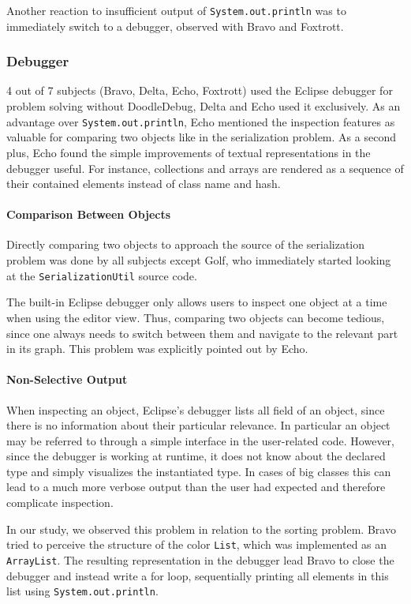 \documentclass[english]{scrartcl}
\newcommand{\DD}{Dood\-le\-De\-bug\xspace}
\newcommand{\println}{\texttt{Sys\-tem.\-out.\-println}\xspace}
\begin{document}
Another reaction to insufficient output of \println was to immediately switch to a debugger, observed with Bravo and Foxtrott.

\subsubsection{Debugger}
4 out of 7 subjects (Bravo, Delta, Echo, Foxtrott) used the Eclipse debugger for problem solving without \DD, Delta and Echo used it exclusively.
As an advantage over \println, Echo mentioned the inspection features as valuable for comparing two objects like in the serialization problem.
As a second plus, Echo found the simple improvements of textual representations in the debugger useful.
For instance, collections and arrays are rendered as a sequence of their contained elements instead of class name and hash.

\paragraph{Comparison Between Objects}
Directly comparing two objects to approach the source of the serialization problem was done by all subjects except Golf, who immediately started looking at the \texttt{SerializationUtil} source code.

The built-in Eclipse debugger only allows users to inspect one object at a time when using the editor view.
Thus, comparing two objects can become tedious, since one always needs to switch between them and navigate to the relevant part in its graph.
This problem was explicitly pointed out by Echo.

\paragraph{Non-Selective Output}
When inspecting an object, Eclipse's debugger lists all field of an object, since there is no information about their particular relevance.
In particular an object may be referred to through a simple interface in the user-related code.
However, since the debugger is working at runtime, it does not know about the declared type and simply visualizes the instantiated type.
In cases of big classes this can lead to a much more verbose output than the user had expected and therefore complicate inspection.

In our study, we observed this problem in relation to the sorting problem.
Bravo tried to perceive the structure of the color \texttt{List}, which was implemented as an \texttt{ArrayList}.
The resulting representation in the debugger lead Bravo to close the debugger and instead write a for loop, sequentially printing all elements in this list using \println.
\end{document}
